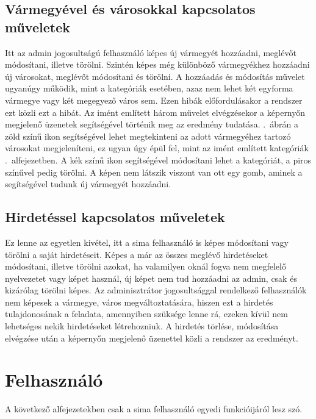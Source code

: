 \documentclass[]{thesis-ekf}
\theoremstyle{definition}
\theoremstyle{remark}
\begin{document}
	\subsection{Vármegyével és városokkal kapcsolatos műveletek}
		Itt az admin jogosultságú felhasználó képes új vármegyét hozzáadni, meglévőt módosítani, illetve törölni. Szintén képes még különböző vármegyékhez hozzáadni új városokat, meglévőt módosítani és törölni. A hozzáadás és módosítás művelet ugyanúgy működik, mint a kategóriák esetében, azaz nem lehet két egyforma vármegye vagy két megegyező város sem. Ezen hibák előfordulásakor a rendszer ezt közli ezt a hibát. Az imént említett három művelet elvégzésekor a képernyőn megjelenő üzenetek segítségével történik meg az eredmény tudatása.  .~ábrán a zöld színű ikon segítségével lehet megtekinteni az adott vármegyéhez tartozó városokat megjeleníteni, ez ugyan úgy épül fel, mint az imént említett kategóriák .~alfejezetben. A kék színű ikon segítségével módosítani lehet a kategóriát, a piros színűvel pedig törölni. A képen nem látszik viszont van ott egy gomb, aminek a segítségével tudunk új vármegyét hozzáadni.
	\subsection{Hirdetéssel kapcsolatos műveletek}
		Ez lenne az egyetlen kivétel, itt a sima felhasználó is képes módosítani vagy törölni a saját hirdetéseit. Képes a már az összes meglévő hirdetéseket módosítani, illetve törölni azokat, ha valamilyen oknál fogva nem megfelelő nyelvezetet vagy képet használ, új képet nem tud hozzáadni az admin, csak és kizárólag törölni képes. Az adminisztrátor jogosultsággal rendelkező felhasználók nem képesek a vármegye, város megváltoztatására, hiszen ezt a hirdetés tulajdonosának a feladata, amennyiben szüksége lenne rá, ezeken kívül nem lehetséges nekik hirdetéseket létrehozniuk. A hirdetés törlése, módosítása elvégzése után a képernyőn megjelenő üzenettel közli a rendszer az eredményt.
	\section{Felhasználó}
		A következő alfejezetekben csak a sima felhasználó egyedi funkcióijáról lesz szó.
\end{document}
